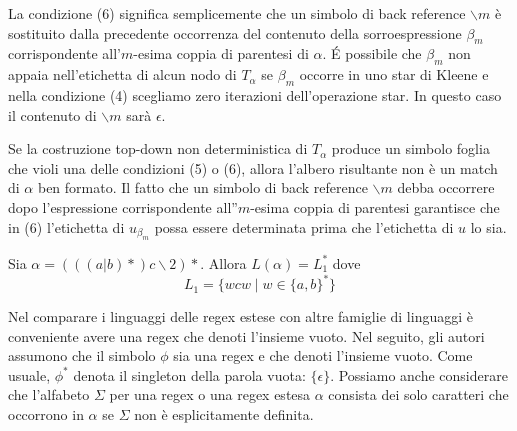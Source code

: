 La condizione (\num{6}) significa semplicemente che un simbolo di back reference $\backslash m$ è sostituito dalla precedente occorrenza del contenuto della sorroespressione $\beta_m$ corrispondente all'$m$-esima coppia di parentesi di $\alpha$. É possibile che $\beta_m$ non appaia nell'etichetta di alcun nodo di $T_\alpha$ se $\beta_m$ occorre in uno star di Kleene e nella condizione (\num{4}) scegliamo zero iterazioni dell'operazione star. In questo caso il contenuto di $\backslash m$ sarà $\epsilon$.

Se la costruzione top-down non deterministica di $T_\alpha$ produce un simbolo foglia che violi una delle condizioni (\num{5}) o (\num{6}), allora l'albero risultante non è un match di $\alpha$ ben formato. Il fatto che un simbolo di back reference $\backslash m$ debba occorrere dopo l'espressione corrispondente all''$m$-esima coppia di parentesi garantisce che in (\num{6}) l'etichetta di $u_{\beta_m}$ possa essere determinata prima che l'etichetta di $u$ lo sia.

\begin{esempio}
	Sia $\alpha = (((a|b)*)c\backslash 2)*$. Allora $L(\alpha) = L_1^*$ dove
	$$ L_1 = \{wcw \mid w\in \{a, b\}^*\} $$
\end{esempio}

Nel comparare i linguaggi delle regex estese con altre famiglie di linguaggi è conveniente avere una regex che denoti l'insieme vuoto. Nel seguito, gli autori assumono che il simbolo $\phi$ sia una regex e che denoti l'insieme vuoto. Come usuale, $\phi^*$ denota il singleton della parola vuota: $\{\epsilon\}$. Possiamo anche considerare  che l'alfabeto $\Sigma$ per una regex o una regex estesa $\alpha$ consista dei solo caratteri che occorrono in $\alpha$ se $\Sigma$ non è esplicitamente definita.
